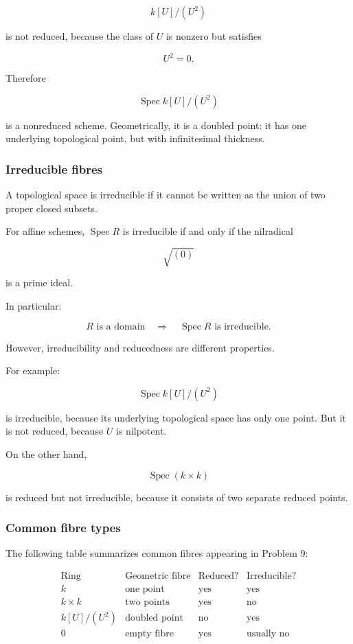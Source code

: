 \documentclass[12pt,a4paper]{article}
\theoremstyle{notespace}
\begin{document}
\[
k[U]/(U^2)
\]

is not reduced, because the class of \(U\) is nonzero but satisfies

\[
U^2=0.
\]

Therefore

\[
\operatorname{Spec}k[U]/(U^2)
\]

is a nonreduced scheme. Geometrically, it is a doubled point: it has one underlying topological point, but with infinitesimal thickness.

\subsubsection{Irreducible fibres}

A topological space is irreducible if it cannot be written as the union of two proper closed subsets.

For affine schemes, \(\operatorname{Spec}R\) is irreducible if and only if the nilradical

\[
\sqrt{(0)}
\]

is a prime ideal.

In particular:

\[
R \text{ is a domain}
\quad\Longrightarrow\quad
\operatorname{Spec}R \text{ is irreducible}.
\]

However, irreducibility and reducedness are different properties.

For example:

\[
\operatorname{Spec}k[U]/(U^2)
\]

is irreducible, because its underlying topological space has only one point. But it is not reduced, because \(U\) is nilpotent.

On the other hand,

\[
\operatorname{Spec}(k\times k)
\]

is reduced but not irreducible, because it consists of two separate reduced points.

\subsubsection{Common fibre types}

The following table summarizes common fibres appearing in Problem 9:

\[
\begin{array}{c|c|c|c}
	\text{Ring} & \text{Geometric fibre} & \text{Reduced?} & \text{Irreducible?} \\
	\hline
	k & \text{one point} & \text{yes} & \text{yes} \\
	k\times k & \text{two points} & \text{yes} & \text{no} \\
	k[U]/(U^2) & \text{doubled point} & \text{no} & \text{yes} \\
	0 & \text{empty fibre} & \text{yes} & \text{usually no}
\end{array}
\]
\end{document}
